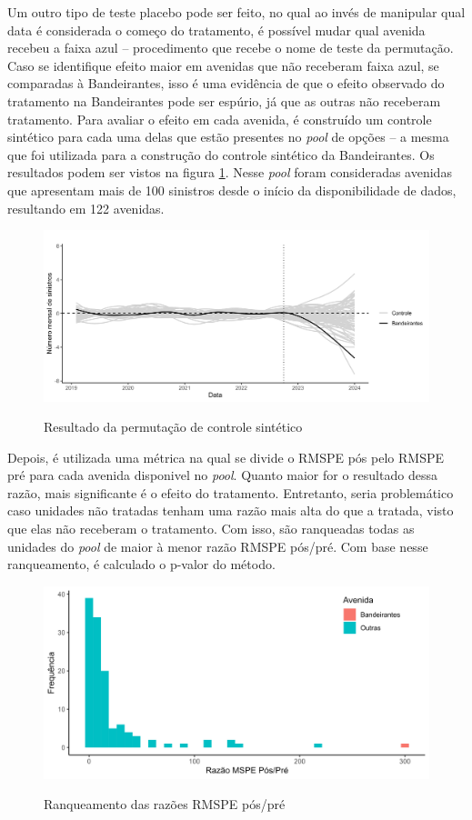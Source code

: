 Um outro tipo de teste placebo pode ser feito, no qual ao invés de manipular qual data é considerada o começo do tratamento, é possível mudar qual avenida recebeu a faixa azul -- procedimento que recebe o nome de teste da permutação. Caso se identifique efeito maior em avenidas que não receberam faixa azul, se comparadas à Bandeirantes, isso é uma evidência de que o efeito observado do tratamento na Bandeirantes pode ser espúrio, já que as outras não receberam tratamento. Para avaliar o efeito em cada avenida, é construído um controle sintético para cada uma delas que estão presentes no \textit{pool} de opções -- a mesma que foi utilizada para a construção do controle sintético da Bandeirantes. Os resultados podem ser vistos na figura \ref{fig:permutacao}. Nesse \textit{pool} foram consideradas avenidas que apresentam mais de 100 sinistros desde o início da disponibilidade de dados, resultando em 122 avenidas. 

\begin{figure}[h]
    \centering
    \caption{Resultado da permutação de controle sintético}
    \includegraphics[width = 0.8\linewidth]{relatorios/faixa-azul/figuras/vassoura.png}    
    \label{fig:permutacao}
\end{figure}

Depois, é utilizada uma métrica na qual se divide o RMSPE pós pelo RMSPE pré para cada avenida disponivel no \textit{pool}. Quanto maior for o resultado dessa razão, mais significante é o efeito do tratamento. Entretanto, seria problemático caso unidades não tratadas tenham uma razão mais alta do que a tratada, visto que elas não receberam o tratamento. Com isso, são ranqueadas todas as unidades do \textit{pool} de maior à menor razão RMSPE pós/pré. Com base nesse ranqueamento, é calculado o p-valor do método. 

\begin{figure}[h]
    \centering
    \caption{Ranqueamento das razões RMSPE pós/pré}
    \includegraphics[width = 0.7\linewidth]{relatorios/faixa-azul/figuras/histograma_ratio.png}    
    \label{fig:ranqueamento}
\end{figure}

